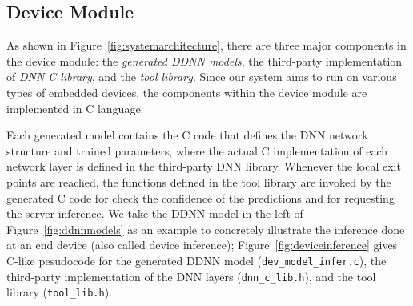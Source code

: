 \documentclass[conference]{IEEEtran}
\def\figurename{Figure}
\begin{document}
\subsection{Device Module}
\label{sec:devicemodule}
As shown in \figurename~\ref{fig:systemarchitecture}, there are three major components in the device module: the \emph{generated DDNN models}, the third-party implementation of \emph{DNN C library}, and the \emph{tool library}. Since our system aims to run on various types of embedded devices, the components within the device module are implemented in C language.

Each generated model contains the C code that defines the DNN network structure and trained parameters, where the actual C implementation of each network layer is defined in the third-party DNN library. Whenever the local exit points are reached, the functions defined in the tool library are invoked by the generated C code for check the confidence of the predictions and for requesting the server inference. We take the DDNN model in the left of \figurename~\ref{fig:ddnnmodels} as an example to concretely illustrate the inference done at an end device (also called device inference); \figurename~\ref{fig:deviceinference} gives C-like pesudocode for the generated DDNN model (\texttt{dev\_model\_infer.c}), the third-party implementation of the DNN layers (\texttt{dnn\_c\_lib.h}), and the tool library (\texttt{tool\_lib.h}).
\end{document}
